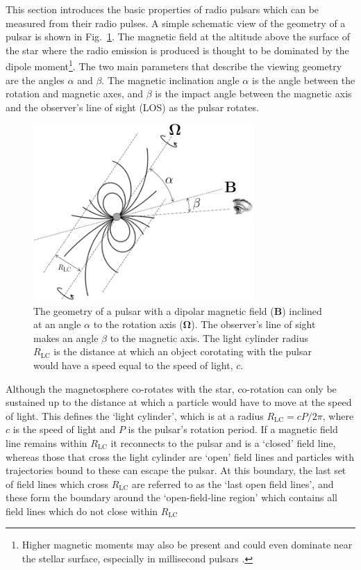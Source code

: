 This section introduces the basic properties of radio pulsars which can be measured from their radio pulses. A simple schematic view of the geometry of a pulsar is shown in Fig.~\ref{fig: intro - basic geometry}. The magnetic field at the altitude above the surface of the star where the radio emission is produced is thought to be dominated by the dipole moment\footnote{Higher magnetic moments may also be present and could even dominate near the stellar surface, especially in millisecond pulsars \citep[e.g.][]{GMGx2003, BWH+2019}.}. The two main parameters that describe the viewing geometry are the angles $\alpha$ and $\beta$. The magnetic inclination angle $\alpha$ is the angle between the rotation and magnetic axes, and $\beta$ is the impact angle between the magnetic axis and the observer's line of sight (LOS) as the pulsar rotates. 
\begin{figure}
    \begin{center}
        \includegraphics[width=0.75\textwidth]{Figures/Introduction/pulsar_geometry}
        \caption[The basic geometry of a radio pulsar]{The geometry of a pulsar with a dipolar magnetic field ($\mathbf{B}$) inclined at an angle $\alpha$ to the rotation axis ($\mathbf{\Omega}$). The observer's line of sight makes an angle $\beta$ to the magnetic axis. The light cylinder radius $R_\mathrm{LC}$ is the distance at which an object corotating with the pulsar would have a speed equal to the speed of light, $c$.}
        \label{fig: intro - basic geometry}
    \end{center}
\end{figure}
Although the magnetosphere co-rotates with the star, co-rotation can only be sustained up to the distance at which a particle would have to move at the speed of light. This defines the `light cylinder', which is at a radius $R_\mathrm{LC} = cP/2\pi$, where $c$ is the speed of light and $P$ is the pulsar's rotation period. If a magnetic field line remains within $R_\mathrm{LC}$ it reconnects to the pulsar and is a `closed' field line, whereas those that cross the light cylinder are `open' field lines and particles with trajectories bound to these can escape the pulsar. At this boundary, the last set of field lines which cross $R_\mathrm{LC}$ are referred to as the `last open field lines', and these form the boundary around the `open-field-line region' which contains all field lines which do not close within $R_\mathrm{LC}$

